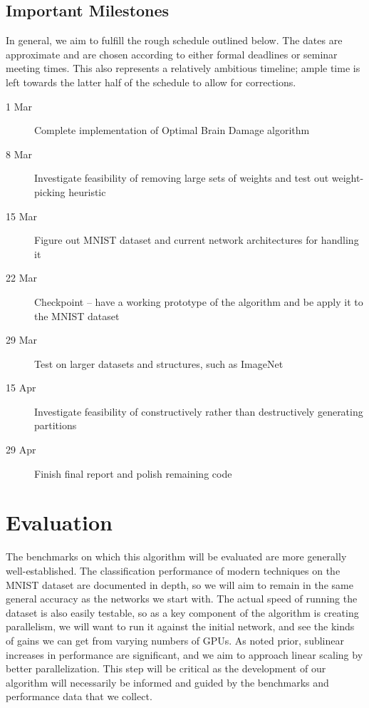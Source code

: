 \documentclass[11pt]{article}
\begin{document}
\subsection{Important Milestones}
In general, we aim to fulfill the rough schedule outlined below.
The dates are approximate and are chosen according to either formal deadlines or seminar meeting times.
This also represents a relatively ambitious timeline; ample time is left towards the latter half of the schedule to allow for corrections.
\begin{description}
  \item[1 Mar] Complete implementation of Optimal Brain Damage algorithm
  \item[8 Mar] Investigate feasibility of removing large sets of weights and test out weight-picking heuristic
  \item[15 Mar] Figure out MNIST dataset and current network architectures for handling it
  \item[22 Mar] Checkpoint -- have a working prototype of the algorithm and be apply it to the MNIST dataset
  \item[29 Mar] Test on larger datasets and structures, such as ImageNet
  \item[15 Apr] Investigate feasibility of constructively rather than destructively generating partitions
  \item[29 Apr] Finish final report and polish remaining code
\end{description}

\section{Evaluation}
The benchmarks on which this algorithm will be evaluated are more generally well-established.
The classification performance of modern techniques on the MNIST dataset are documented in depth, so we will aim to remain in the same general accuracy as the networks we start with.
The actual speed of running the dataset is also easily testable, so as a key component of the algorithm is creating parallelism, we will want to run it against the initial network, and see the kinds of gains we can get from varying numbers of GPUs.
As noted prior, sublinear increases in performance are significant, and we aim to approach linear scaling by better parallelization.
This step will be critical as the development of our algorithm will necessarily be informed and guided by the benchmarks and performance data that we collect.



\end{document}
